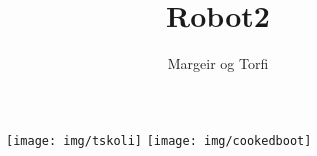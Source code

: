 \documentclass{article}
\begin{document}
\title {Robot2}
\author{Margeir og Torfi}
\maketitle
\begin{figure}[h]
\centering
\texttt{[image: img/tskoli]}
\noindent\texttt{[image: img/cookedboot]}
\end{figure}
\newpage
\tableofcontents
\newpage





\end{document}
